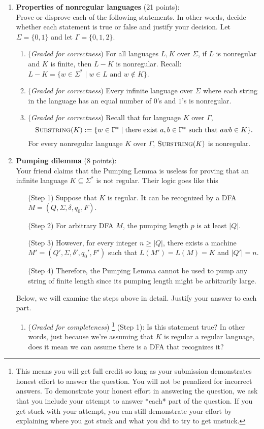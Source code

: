 \documentclass[12pt, oneside]{article}
\newcommand{\gradeCorrect}{({\it Graded for correctness}) }
\newcommand{\gradeComplete}{({\it Graded for completeness}) }
\newcommand{\gradeCompleteFirst}{\gradeComplete\footnote{This means you will 
get full credit so long as your submission demonstrates honest effort to 
answer the question. You will not be penalized for incorrect answers. 
To demonstrate your honest effort in answering the question, we ask 
that you include your attempt to answer *each* part of the question. 
If you get stuck with your attempt, you can still demonstrate 
your effort by explaining where you got stuck and what 
you did to try to get unstuck.} }
\newcommand{\SUBSTRING}{\textsc{Substring}}
\begin{document}
\begin{enumerate}
\item \textbf{Properties of nonregular languages} (21 points): \\
Prove or disprove each of the following statements. In other words, decide whether 
each statement is true or false and justify your decision. 
Let $\Sigma = \{0,1\}$ and let $\Gamma = \{0,1,2\}$.
\begin{enumerate}
    \item\gradeCorrect For all languages $L, K$ over
    $\Sigma$, if $L$ is nonregular and $K$ is finite, then $L - K$ is nonregular.
    Recall: $L - K = \{ w \in \Sigma^* \mid w \in L \text{ and } w \notin K\}$.
    \item\gradeCorrect Every infinite language over $\Sigma$ 
    where each string in the language has an equal number of $0$'s and 
    $1$'s is nonregular.
    \item\gradeCorrect Recall that for language $K$ over $\Gamma$,
    \[
    \SUBSTRING(K) := \{ w \in \Gamma^* \mid \text{there exist } a,b \in \Gamma^* \text{ such that } awb \in K\}.
    \]
    For every nonregular language $K$ over $\Gamma$, $\SUBSTRING(K)$ is nonregular.
\end{enumerate}

\item \textbf{Pumping dilemma} (8 points): \\
Your friend claims that the Pumping Lemma is useless for proving that an infinite language 
$K \subseteq \Sigma^*$ is not regular. Their logic goes like this

\begin{enumerate}[label=(Step~\arabic*), leftmargin=2cm]
\item[(Step 1)] Suppose that $K$ is regular. It can be recognized by a 
DFA $M = (Q, \Sigma, \delta, q_0, F)$.
\item[(Step 2)] For arbitrary DFA $M$, the pumping length $p$ is at least $|Q|$.
\item[(Step 3)] However, for every integer $n \ge |Q|$, there exists a machine 
$M' = (Q', \Sigma, \delta', q_0', F')$ such that $L(M') = L(M) = K$ and $|Q'| = n$.
\item[(Step 4)] Therefore, the Pumping Lemma cannot be used to pump any string 
of finite length since its pumping length might be arbitrarily large.
\end{enumerate}

Below, we will examine the steps above in detail. Justify your answer to each part.
\begin{enumerate}
    \item\gradeCompleteFirst (Step 1): Is this statement true? In other words, just because we're assuming that $K$ is regular a regular language, does it mean we can assume there is a DFA that recognizes it?


\end{enumerate}
\end{enumerate}
\end{document}
